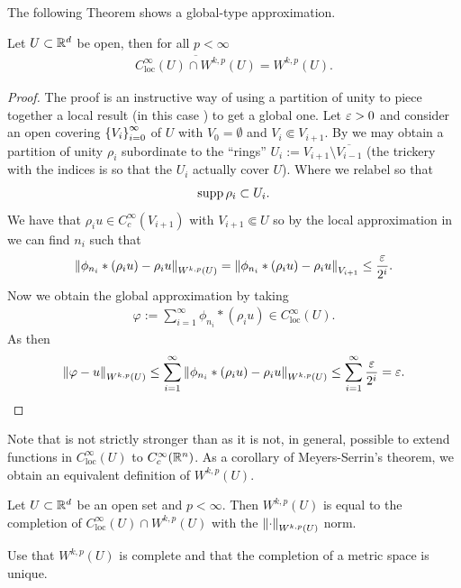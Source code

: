 \documentclass[
    a4paper,
    DIV=14,
    abstract=true,
    numbers=noenddot
]{scrartcl}
\begin{document}
The following Theorem shows a global-type approximation.
\begin{theorem}\label{Meyers}
	Let $U \subset \mathbb{R}^d$ be open, then for all $p<\infty$
	\begin{align*}
		\overline{C^\infty_{\mathrm{loc}}(U)\cap W^{k,p}(U)}=W^{k,p}(U).
	\end{align*}
\end{theorem}
\begin{proof}The proof is an instructive way of using a partition of unity to piece together a local result (in this case ) to get a global one. Let $\varepsilon >0$ and consider an open covering $\left\{V_i\right\}_{i=0}^\infty $ of $U$ with $V_0 =\emptyset$ and $V_{i} \Subset V_{i+1}$. By  we may obtain a partition of unity $\rho _i$ subordinate to the ``rings'' $U_{i}:= V_{i+1}\setminus \overline{V_{i-1}}$ (the trickery with the indices is so that the $U_i$ actually  cover $U$). Where we relabel so that
	\begin{align*}
		\operatorname{supp}{\rho _i}\subset U_i .
	\end{align*}
	We have that $\rho_i u \in C_c^\infty({V_{i+1}})$ with $V_{i+1} \Subset U$ so by the local approximation in  we can find $n_i$ such that
	\begin{align*}
		\left\lVert \phi_{n_i}*(\rho_i u)-\rho_i u \right\rVert_{W^{k,p}(U)}=\left\lVert \phi_{n_i}*(\rho_i u)-\rho_i u \right\rVert_{V_{i+1}}\leq \frac{\varepsilon }{2^i} .
	\end{align*}
	Now we obtain the global approximation by taking
	\begin{align*}
		\varphi:= \sum_{i=1}^\infty \phi_{n_i}* (\rho_i u) \in C_{\mathrm{loc}}^\infty(U) .
	\end{align*}
	As then
	\begin{align*}
		\left\lVert \varphi-u \right\rVert
		_{W^{k,p}(U)}\leq\sum_{i=1}^\infty \left\lVert \phi_{n_i}*(\rho_i u)-\rho_i u  \right\rVert_{W^{k,p}(U)}\leq \sum_{i=1}^\infty \frac{\varepsilon }{2^i}=\varepsilon   .
	\end{align*}
\end{proof}
Note that  is not strictly stronger than  as it is not, in general, possible to extend functions in $C^\infty_{\mathrm{loc}}(U)$ to $C_c^\infty(\mathbb{R}^n)$. As a corollary of Meyers-Serrin's theorem, we obtain an equivalent definition of $W^{k,p}(U)$.
\begin{exercise}\label{eq def} Let $U \subset \mathbb{R}^d$ be an open set and $p<\infty$. Then $W^{k,p}(U)$ is equal to the completion of  $C^\infty_{\mathrm{loc}}(U)\cap W^{k,p}(U)$ with the $\left\lVert \cdot  \right\rVert_{W^{k,p}(U)}$ norm.
\end{exercise}
\begin{hint}
	Use that $W^{k,p}(U)$ is complete and that the completion of a metric space is unique.
\end{hint}
\end{document}
